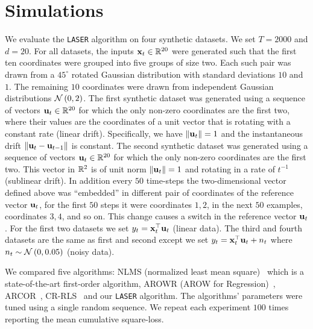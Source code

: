 \chapter{Simulations}
\label{sec:simulations}

We evaluate the \texttt{LASER} %
 algorithm on four synthetic datasets.
We set $T=2000$ and $d=20$. For all datasets, the
inputs $\mathbf{x}_t\in\mathbb{R}^{20}$ were generated such that
the first ten coordinates were grouped into five groups of size
two. Each such pair was drawn from a $45^\circ$ rotated Gaussian
distribution with standard deviations $10$ and $1$. The remaining $10$
coordinates were drawn from independent Gaussian distributions
${\mathcal{N}}\left({0,2}\right)$. The first synthetic dataset was
generated using a sequence of vectors $\mathbf{u}_{t}\in\mathbb{R}^{20}$ for
which the only non-zero coordinates are the first two, where their
values are the coordinates of a unit vector that is rotating with a
constant rate (linear drift). Specifically, we have $\Vert\mathbf{u}_{t}\Vert=1$ and the
instantaneous drift $\Vert\mathbf{u}_{t}-\mathbf{u}_{t-1}\Vert$ is constant.  The
second synthetic dataset was generated using a sequence
of vectors $\mathbf{u}_{t}\in\mathbb{R}^{20}$ for which the only non-zero
coordinates are the first two. This vector in $\mathbb{R}^2$ is of unit
norm $\Vert\mathbf{u}_{t}\Vert=1$ and rotating in a rate of $t^{-1}$ (sublinear drift). In
addition every $50$ time-steps the two-dimensional vector defined
above was ``embedded'' in different pair of coordinates of the
reference vector $\mathbf{u}_{t}$, for the first $50$ steps it were
coordinates $1,2$, in the next $50$ examples, coordinates $3,4$, and
so on. This change causes a switch in the reference vector $\mathbf{u}_{t}$.
For the first two datasets we set $y_{t}={\mathbf{x}}^{\top}_{t}\mathbf{u}_{t}$ (linear data).
The third and fourth datasets are the same as first and second except we set $y_{t}={\mathbf{x}}^{\top}_{t}\mathbf{u}_{t}+n_t$ where
$n_t\sim{\mathcal{N}}\left({0,0.05}\right)$ (noisy data).

We compared five algorithms: NLMS (normalized least mean
square)~\citep{Bershad,Bitmead} which is a state-of-the-art first-order
algorithm, AROWR (AROW for Regression)~\citep{CrammerKuDr09},
ARCOR~\citep{VaitsCr11}, CR-RLS~\citep{Salgado,Goodwin,Chen} and our \texttt{LASER} %
algorithm. The
algorithms' parameters were tuned using a single random sequence. We
repeat each experiment $100$ times reporting the mean cumulative
square-loss.

